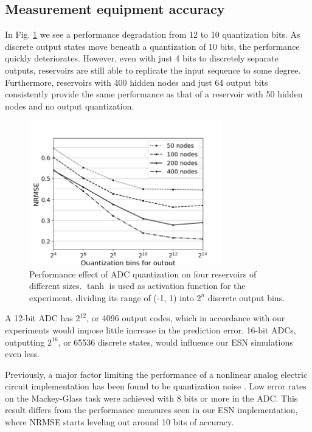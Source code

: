 \subsection{Measurement equipment accuracy}

In Fig. \ref{adc_quantization} we see a performance degradation from 12 to 10
quantization bits. As discrete output states move beneath a quantization of 10
bits, the performance quickly deteriorates. However, even with just 4 bits to
discretely separate outputs, reservoirs are still able to replicate the input
sequence to some degree. Furthermore, reservoirs with 400 hidden nodes and just
64 output bits consistently provide the same performance as that of a reservoir
with 50 hidden nodes and no output quantization.

\begin{figure}[H]
  \centering
  \includegraphics[width=3.3in]{img/adc_quantization.png}
  \caption{
    Performance effect of ADC quantization on four reservoirs of different
sizes. $\tanh$ is used as activation function for the experiment, dividing its
range of (-1, 1) into $2^n$ discrete output bins.
  }
  \label{adc_quantization}
\end{figure}

A 12-bit ADC has $2^{12}$, or 4096 output codes, which in accordance with our
experiments would impose little increase in the prediction error. 16-bit ADCs,
outputting $2^{16}$, or 65536 discrete states, would influence our ESN
simulations even less.

Previously, a major factor limiting the performance of a nonlinear analog
electric circuit implementation has been found to be quantization noise
\cite{soriano_delay-based_2015}. Low error rates on the Mackey-Glass task were
achieved with 8 bits or more in the ADC. This result differs from the
performance measures seen in our ESN implementation, where NRMSE starts leveling
out around 10 bits of accuracy.

